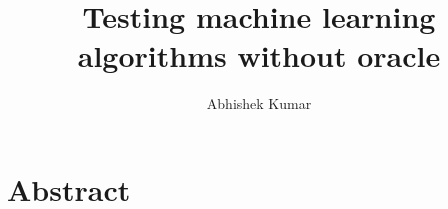\documentclass[12pt]{report}
\begin{document}
	\author{Abhishek Kumar}
	\title{ Testing machine learning algorithms without oracle }
	\maketitle

	\chapter{Abstract}
	\nocite{*}
	
	
	
\end{document}
